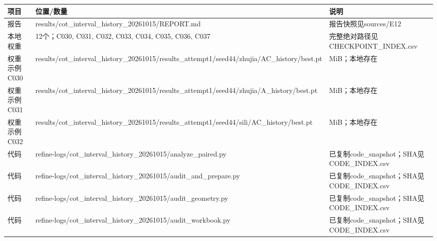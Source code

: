 \documentclass[UTF8,a4paper,landscape,10pt]{ctexart}
\begin{document}
\begin{center}\small
\begin{adjustbox}{max totalheight=0.58\textheight,max width=\linewidth}
\begin{minipage}{\linewidth}\begin{tabularx}{\linewidth}{>{\hsize=0.3500\hsize\raggedright\arraybackslash}X>{\hsize=1.9000\hsize\raggedright\arraybackslash}X>{\hsize=0.7500\hsize\raggedright\arraybackslash}X}\toprule
\textbf{项目} & \textbf{位置/\allowbreak{}数量} & \textbf{说明} \\ \midrule
报告 & results/\allowbreak{}cot\_\allowbreak{}interval\_\allowbreak{}history\_\allowbreak{}20261015/\allowbreak{}REPORT.md & 报告快照见sources/\allowbreak{}E12 \\
本地权重 & 12个；C030, C031, C032, C033, C034, C035, C036, C037 & 完整绝对路径见CHECKPOINT\_\allowbreak{}INDEX.csv \\
权重示例 C030 & results/\allowbreak{}cot\_\allowbreak{}interval\_\allowbreak{}history\_\allowbreak{}20261015/\allowbreak{}results\_\allowbreak{}attempt1/\allowbreak{}seed44/\allowbreak{}zhujia/\allowbreak{}AC\_\allowbreak{}history/\allowbreak{}best.pt & 0.2 MiB；本地存在 \\
权重示例 C031 & results/\allowbreak{}cot\_\allowbreak{}interval\_\allowbreak{}history\_\allowbreak{}20261015/\allowbreak{}results\_\allowbreak{}attempt1/\allowbreak{}seed44/\allowbreak{}zhujia/\allowbreak{}A\_\allowbreak{}history/\allowbreak{}best.pt & 0.2 MiB；本地存在 \\
权重示例 C032 & results/\allowbreak{}cot\_\allowbreak{}interval\_\allowbreak{}history\_\allowbreak{}20261015/\allowbreak{}results\_\allowbreak{}attempt1/\allowbreak{}seed44/\allowbreak{}sili/\allowbreak{}AC\_\allowbreak{}history/\allowbreak{}best.pt & 0.2 MiB；本地存在 \\
代码 & refine-logs/\allowbreak{}cot\_\allowbreak{}interval\_\allowbreak{}history\_\allowbreak{}20261015/\allowbreak{}analyze\_\allowbreak{}paired.py & 已复制code\_\allowbreak{}snapshot；SHA见CODE\_\allowbreak{}INDEX.csv \\
代码 & refine-logs/\allowbreak{}cot\_\allowbreak{}interval\_\allowbreak{}history\_\allowbreak{}20261015/\allowbreak{}audit\_\allowbreak{}and\_\allowbreak{}prepare.py & 已复制code\_\allowbreak{}snapshot；SHA见CODE\_\allowbreak{}INDEX.csv \\
代码 & refine-logs/\allowbreak{}cot\_\allowbreak{}interval\_\allowbreak{}history\_\allowbreak{}20261015/\allowbreak{}audit\_\allowbreak{}geometry.py & 已复制code\_\allowbreak{}snapshot；SHA见CODE\_\allowbreak{}INDEX.csv \\
代码 & refine-logs/\allowbreak{}cot\_\allowbreak{}interval\_\allowbreak{}history\_\allowbreak{}20261015/\allowbreak{}audit\_\allowbreak{}workbook.py & 已复制code\_\allowbreak{}snapshot；SHA见CODE\_\allowbreak{}INDEX.csv \\
\bottomrule\end{tabularx}\end{minipage}\end{adjustbox}\end{center}
\end{document}

